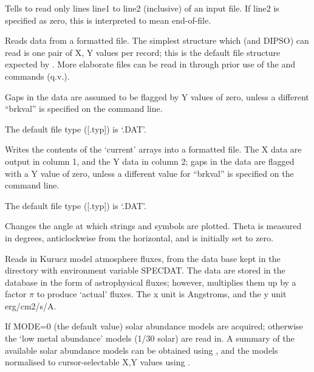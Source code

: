 \begin {description}
Tells   to read only lines line1 to line2 (inclusive) of an input
file. If line2 is specified as zero, this is interpreted to mean
end-of-file.

Reads data from a formatted file. The simplest structure which  
(and DIPSO) can read is one pair of X, Y values per record; this is
the default file structure expected by .  More elaborate files
can be read in through prior use of the   and   commands
(q.v.).

Gaps in the data are assumed to be flagged by Y values of zero, unless
a different ``brkval'' is specified on the command line.

The default file type ([.typ]) is `.DAT'.

Writes the contents of the `current' arrays into a formatted file. The
X data are output in column 1, and the Y data in column 2; gaps in the
data are flagged with a Y value of zero, unless a different value for
``brkval'' is specified on the command line.

The default file type ([.typ]) is `.DAT'.

Changes the angle at which   strings and   symbols are
plotted. Theta is measured in degrees, anticlockwise from the
horizontal, and is initially set to zero.

Reads in Kurucz model atmosphere fluxes, from the data base kept in
the directory with environment variable SPECDAT. The
data are stored in the database in the form of astrophysical fluxes;
however,   multiplies them up by a factor $\pi$ to produce
`actual' fluxes. The x unit is Angstroms, and the y unit erg/cm2/s/A.

If MODE=0 (the default value) solar abundance models are acquired;
otherwise the `low metal abundance' models (1/30 solar) are read in. A
summary of the available solar abundance models can be obtained using
,  and the models normalised to cursor-selectable X,Y values
using . 


\end{description}
